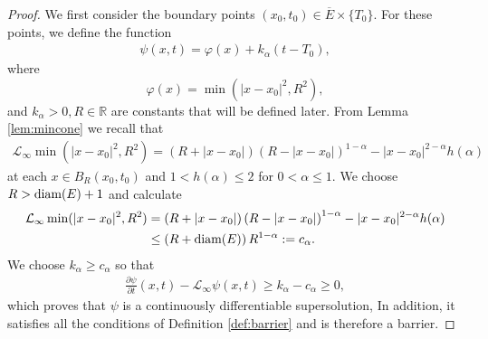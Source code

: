 \documentclass[11pt]{article}
\newcommand{\R}{\mathbb{R}}
\providecommand{\Linf}{\mathcal{L}_{\infty}}
\numberwithin{equation}{section}
\theoremstyle{definition}
\begin{document}
\begin{proof}
    We first consider the boundary points $(x_0,t_0) \in \overline{E} \times \{T_0 \}$. For these points, we define the function 
   \begin{align}\label{eq:barrierbottomcyl}
      \psi(x,t)= \varphi(x)+ k_{\alpha}(t-T_0), 
    \end{align}
 where
$$
\varphi(x)=  \min(|x-x_0|^2, R^2),
$$
and $k_{\alpha}>0, R \in \R$ are constants that will be defined later. From Lemma \ref{lem:mincone} we recall that 
    \begin{align*}
     \Linf \min(|x-x_0|^2, R^2)= 
                      \left(R+|x-x_0| \right) \left(R-|x-x_0| \right)^{1-\alpha} - |x-x_0|^{2-\alpha} h(\alpha)
     \end{align*} 
     at each $x \in B_R(x_0,t_0)$ and  $1<h(\alpha)\leq2$ for $0<\alpha \leq 1$. We choose $R> \textup{diam}(E)+1 $ and calculate
     \begin{align*}
         \Linf \min(|x-x_0|^2, R^2) &= 
                      \left(R+|x-x_0| \right) \left(R-|x-x_0| \right)^{1-\alpha} - |x-x_0|^{2-\alpha} h(\alpha)\\
                      &\leq \left(R + \textup{diam}(E) \right) R^{1-\alpha}:=c_{\alpha}.
     \end{align*}
     We choose $k_{\alpha} \geq c_{\alpha}$ so that
     \begin{align*}
         \frac{\partial \psi}{\partial t}(x,t)-\Linf \psi(x,t) \geq k_{\alpha}-c_{\alpha} \geq 0,
     \end{align*}
 which proves that $\psi$ is a continuously differentiable supersolution, In addition, it satisfies all the conditions of Definition \ref{def:barrier} and is therefore a barrier.
    

\end{proof}
\end{document}

